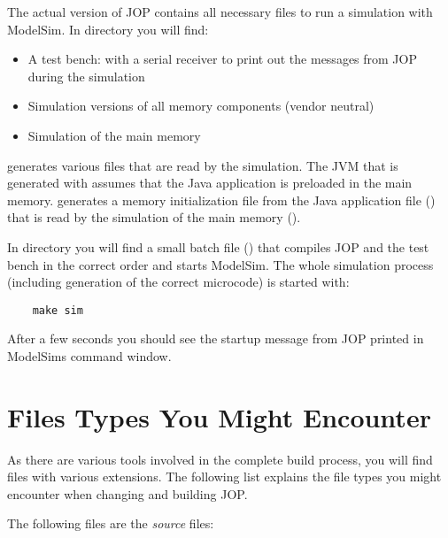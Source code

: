 The actual version of JOP contains all necessary files to run a
simulation with ModelSim. In directory  you
will find:
%
\begin{itemize}
    \item A test bench:  with a serial receiver to
    print out the messages from JOP during the simulation
    \item Simulation versions of all memory components (vendor neutral)
    \item Simulation of the main memory
\end{itemize}
%
 generates various  files that are read
by the simulation. The JVM that is generated with 
assumes that the Java application is preloaded in the main memory.
 generates a memory initialization file from the Java
application file () that is read by the
simulation of the main memory ().

In directory  you will find a small batch file
() that compiles JOP and the test bench in the correct
order and starts ModelSim. The whole simulation process (including
generation of the correct microcode) is started with:

\begin{verbatim}
    make sim
\end{verbatim}

After a few seconds you should see the startup message from JOP
printed in ModelSims command window.

\section{Files Types You Might Encounter}

As there are various tools involved in the complete build process,
you will find files with various extensions. The following list
explains the file types you might encounter when changing and
building JOP.

The following files are the \emph{source} files:


